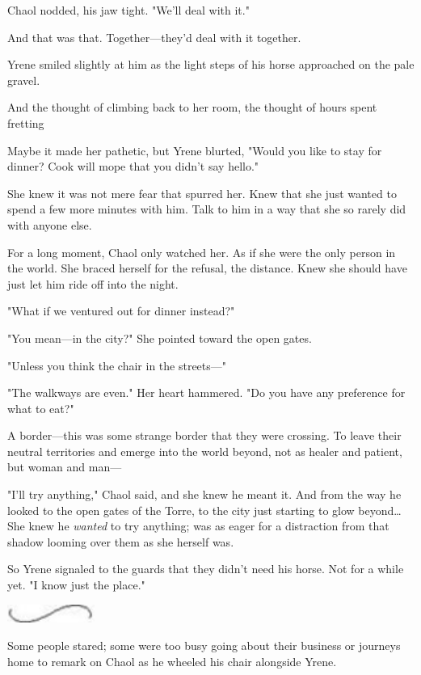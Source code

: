 Chaol nodded, his jaw tight.
"We'll deal with it."

And that was that.
Together---they'd deal with it together.

Yrene smiled slightly at him as the light steps of his horse approached on the pale gravel.

And the thought of climbing back to her room, the thought of hours spent fretting 

Maybe it made her pathetic, but Yrene blurted, "Would you like to stay for dinner?
Cook will mope that you didn't say hello."

She knew it was not mere fear that spurred her.
Knew that she just wanted to spend a few more minutes with him.
Talk to him in a way that she so rarely did with anyone else.

For a long moment, Chaol only watched her.
As if she were the only person in the world.
She braced herself for the refusal, the distance.
Knew she should have just let him ride off into the night.

"What if we ventured out for dinner instead?"

"You mean---in the city?"
She pointed toward the open gates.

"Unless you think the chair in the streets---"

"The walkways are even."
Her heart hammered.
"Do you have any preference for what to eat?"

A border---this was some strange border that they were crossing.
To leave their neutral territories and emerge into the world beyond, not as healer and patient, but woman and man---

"I'll try anything," Chaol said, and she knew he meant it.
And from the way he looked to the open gates of the Torre, to the city just starting to glow beyond\ldots She knew he \emph{wanted} to try anything; was as eager for a distraction from that shadow looming over them as she herself was.

So Yrene signaled to the guards that they didn't need his horse.
Not for a while yet.
"I know just the place."

\begin{center}
	\includegraphics[width=1.12in,height=0.24in]{images/seperator}
\end{center}

Some people stared; some were too busy going about their business or journeys home to remark on Chaol as he wheeled his chair alongside Yrene.

